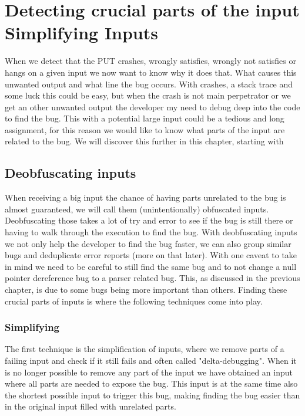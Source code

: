 \chapter{Detecting crucial parts of the input Simplifying Inputs} 
\label{cha:3}
When we detect that the PUT crashes, wrongly satisfies, wrongly not satisfies or hangs on a given input we now want to know why it does that. What causes this unwanted output and what line the bug occurs. With crashes, a stack trace and some luck this could be easy, but when the crash is not main perpetrator or we get an other unwanted output the developer my need to debug deep into the code to find the bug. This with a potential large input could be a tedious and long assignment, for this reason we would like to know what parts of the input are related to the bug. We will discover this further in this chapter, starting with 

\section{Deobfuscating inputs}
When receiving a big input the chance of having parts unrelated to the bug is almost guaranteed, we will call them (unintentionally) obfuscated inputs. Deobfuscating those takes a lot of try and error to see if the bug is still there\cite{bookZellerwhyProgramsFail} or having to walk through the execution to find the bug. With deobfuscating inputs we not only help the developer to find the bug faster, we can also group similar bugs and deduplicate error reports (more on that later). With one caveat to take in mind we need to be careful to still find the same bug and to not change a null pointer dereference bug to a parser related bug. This, as discussed in the previous chapter, is due to some bugs being more important than others. Finding these crucial parts of inputs is where the following techniques come into play.
\subsection{Simplifying}
The first technique is the simplification of inputs, where we remove parts of a failing input and check if it still fails and often called "delta-debugging"\cite{bookZellerwhyProgramsFail}. When it is no longer possible to remove any part of the input we have obtained an input where all parts are needed to expose the bug. This input is at the same time also the shortest possible input to trigger this bug, making finding the bug easier than in the original input filled with unrelated parts.
